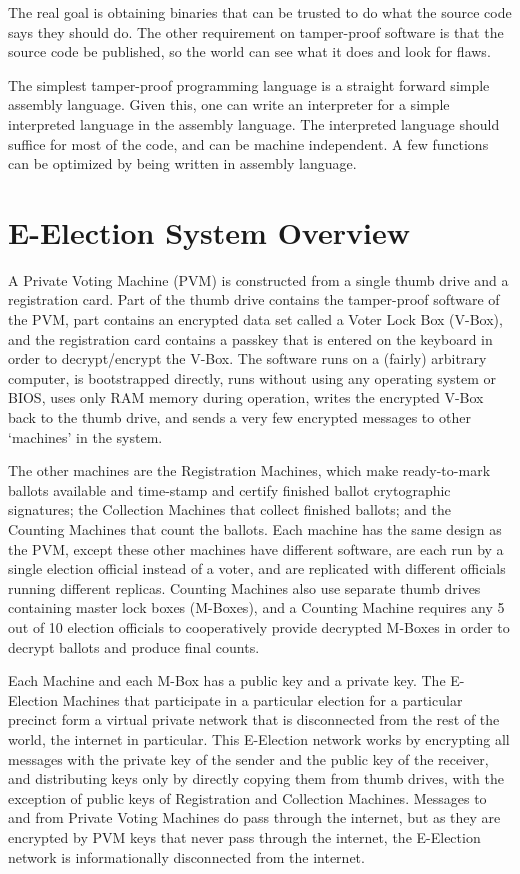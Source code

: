 \documentclass[12pt]{article}
\begin{document}
The real goal is obtaining binaries that can be trusted to
do what the source code says they should do.  The other
requirement on tamper-proof software is that the source code
be published, so the world can see what it does and look
for flaws.

The simplest tamper-proof programming language is a straight
forward simple assembly language.  Given this, one can write
an interpreter for a simple interpreted language in the
assembly language.  The interpreted language should suffice
for most of the code, and can be machine independent.
A few functions can be optimized by being written in assembly
language.

\section{E-Election System Overview}

A Private Voting Machine
(PVM) is constructed from a single thumb drive and a
registration card.  Part of the thumb drive contains the
tamper-proof software of the PVM, part contains an encrypted
data set called a Voter Lock Box (V-Box), and the registration
card contains a passkey that is entered on the keyboard in
order to decrypt/encrypt the V-Box.  The software runs on
a (fairly) arbitrary computer, is bootstrapped directly,
runs without using any operating system or BIOS,
uses only RAM memory during operation,
writes the encrypted V-Box back to the thumb drive, and sends
a very few encrypted messages to other `machines' in the
system.

The other machines are the Registration Machines, which make
ready-to-mark ballots available and time-stamp and certify
finished ballot crytographic signatures;
the Collection Machines that collect
finished ballots; and the Counting Machines that count the
ballots.  Each machine has the same design as the PVM, except
these other machines have different software,
are each run by a single election official instead of a voter, and
are replicated with different officials running different
replicas.  Counting Machines also use separate
thumb drives containing master lock boxes
(M-Boxes), and a Counting Machine requires
any 5 out of 10 election officials to cooperatively
provide decrypted M-Boxes in order to decrypt ballots and
produce final counts.

Each Machine and each M-Box has a public key and a private key.
The E-Election Machines that participate in
a particular election for a particular
precinct form a virtual private network that is disconnected from
the rest of the world, the internet in particular.  This E-Election
network works by encrypting all messages with the private key of the
sender and the public key of the receiver, and distributing
keys only by directly copying them from
thumb drives, with the exception of public keys of Registration and
Collection Machines.  Messages to and from Private Voting Machines do pass
through the internet, but as they are encrypted by PVM keys that never
pass through the internet, the E-Election network is informationally
disconnected from the internet.
\end{document}
